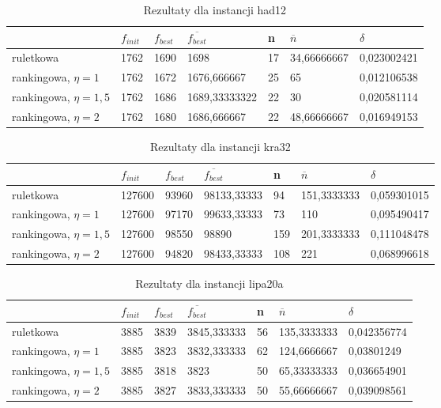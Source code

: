 \begin{table}[H]
\label{T5_had12}
\begin{tabular}{l l l l l l l}
\hline
 & $f_{init}$ & $f_{best}$ & $\overline{f_{best}}$ & n & $\overline{n}$ & $\delta$ \\
\hline
ruletkowa & 1762 & 1690 & 1698 & 17 & 34,66666667 & 0,023002421\\
rankingowa, $\eta = 1$ & 1762 & 1672 & 1676,666667 & 25 & 65 & 0,012106538\\
rankingowa, $\eta = 1,5$ & 1762 & 1686 & 1689,33333322 & 22 & 30 & 0,020581114\\
rankingowa, $\eta = 2$ & 1762 & 1680 & 1686,666667 & 22 & 48,66666667 & 0,016949153\\
\hline
\end{tabular}
\caption{Rezultaty dla instancji had12}
\end{table}

\begin{table}[H]
\label{T5_kra32}
\begin{tabular}{l l l l l l l}
\hline
 & $f_{init}$ & $f_{best}$ & $\overline{f_{best}}$ & n & $\overline{n}$ & $\delta$ \\
\hline
ruletkowa & 127600 & 93960 & 98133,33333 & 94 & 151,3333333 & 0,059301015\\
rankingowa, $\eta = 1$ & 127600 & 97170 & 99633,33333 & 73 & 110 & 0,095490417\\
rankingowa, $\eta = 1,5$ & 127600 & 98550 & 98890 & 159 & 201,3333333 & 0,111048478\\
rankingowa, $\eta = 2$ & 127600 & 94820 & 98433,33333 & 108 & 221 & 0,068996618\\
\hline
\end{tabular}
\caption{Rezultaty dla instancji kra32}
\end{table}

\begin{table}[H]
\label{T5_lipa20a}
\begin{tabular}{l l l l l l l}
\hline
 & $f_{init}$ & $f_{best}$ & $\overline{f_{best}}$ & n & $\overline{n}$ & $\delta$ \\
\hline
ruletkowa & 3885 & 3839 & 3845,333333 & 56 & 135,3333333 & 0,042356774\\
rankingowa, $\eta = 1$ & 3885 & 3823 & 3832,333333 & 62 & 124,6666667 & 0,03801249\\
rankingowa, $\eta = 1,5$ & 3885 & 3818 & 3823 & 50 & 65,33333333 & 0,036654901\\
rankingowa, $\eta = 2$ & 3885 & 3827 & 3833,333333 & 50 & 55,66666667 & 0,039098561\\
\hline
\end{tabular}
\caption{Rezultaty dla instancji lipa20a}
\end{table}

